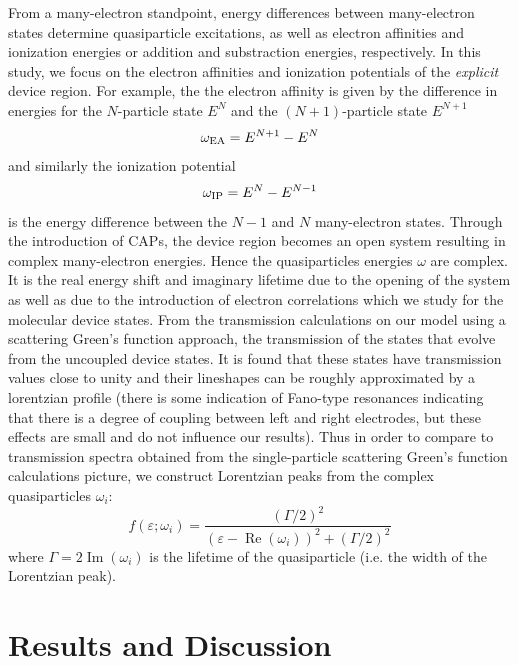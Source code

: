 From a many-electron standpoint, energy differences between
many-electron states determine quasiparticle excitations, as well as
electron affinities and ionization energies or addition and substraction
energies, respectively. In this study, we focus on the electron
affinities and ionization potentials of the {\it explicit} device
region. For example, the the electron affinity is given by the
difference in energies for the $N$-particle state $E^N$ and the
$(N+1)$-particle state $E^{N+1}$
\begin{equation}
\omega_{\rm EA} = E^{N+1} -E^N
\end{equation}
and similarly the ionization potential
\begin{equation}
\omega_{\rm IP} =  E^N - E^{N-1}
\end{equation}
is the energy difference between the $N-1$ and $N$ many-electron states.
Through the introduction of \acp{CAP}, the device region becomes an open
system resulting in complex many-electron energies. Hence the
quasiparticles energies $\omega$ are complex. It is the real energy
shift and imaginary lifetime due to the opening of the system as well
as due to the introduction of electron correlations which we study for
the molecular device states.
From the transmission calculations on our model using a scattering Green's
function approach, the transmission of the states that evolve from the
uncoupled device states. %
It is found that these states have transmission values close to unity and
their lineshapes can be roughly approximated by a lorentzian profile (there
is some indication of Fano-type resonances indicating that there is a degree
of coupling between left and right electrodes, but these effects are small
and do not influence our results). Thus in order to compare to
transmission spectra obtained from the single-particle scattering
Green's function calculations picture, we construct Lorentzian peaks from
the complex quasiparticles $\omega_i$:
\begin{equation}
        f(\varepsilon;\omega_i)
        = \frac{\left( \Gamma/2 \right)^2}
               {(\varepsilon - \operatorname{Re}(\omega_i))^2
               + \left( \Gamma/2 \right)^2}
        \label{eq:lobro}
\end{equation}
where $\Gamma = 2 \operatorname{Im}(\omega_i)$ is the lifetime of the
quasiparticle (i.e. the width of the Lorentzian peak).

\section{Results and Discussion}
\label{sec:results}

